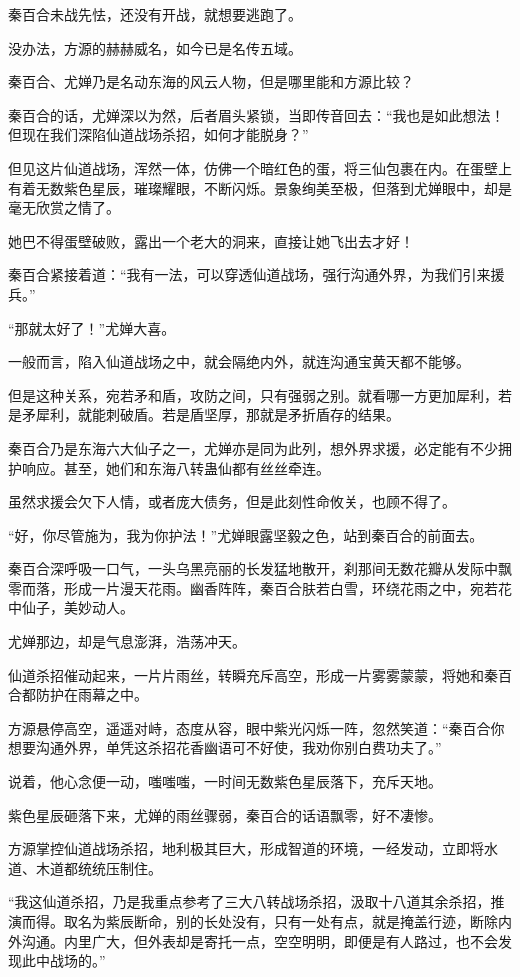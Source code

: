 \begin{this_body}
秦百合未战先怯，还没有开战，就想要逃跑了。

没办法，方源的赫赫威名，如今已是名传五域。

秦百合、尤婵乃是名动东海的风云人物，但是哪里能和方源比较？

秦百合的话，尤婵深以为然，后者眉头紧锁，当即传音回去：“我也是如此想法！但现在我们深陷仙道战场杀招，如何才能脱身？”

但见这片仙道战场，浑然一体，仿佛一个暗红色的蛋，将三仙包裹在内。在蛋壁上有着无数紫色星辰，璀璨耀眼，不断闪烁。景象绚美至极，但落到尤婵眼中，却是毫无欣赏之情了。

她巴不得蛋壁破败，露出一个老大的洞来，直接让她飞出去才好！

秦百合紧接着道：“我有一法，可以穿透仙道战场，强行沟通外界，为我们引来援兵。”

“那就太好了！”尤婵大喜。

一般而言，陷入仙道战场之中，就会隔绝内外，就连沟通宝黄天都不能够。

但是这种关系，宛若矛和盾，攻防之间，只有强弱之别。就看哪一方更加犀利，若是矛犀利，就能刺破盾。若是盾坚厚，那就是矛折盾存的结果。

秦百合乃是东海六大仙子之一，尤婵亦是同为此列，想外界求援，必定能有不少拥护响应。甚至，她们和东海八转蛊仙都有丝丝牵连。

虽然求援会欠下人情，或者庞大债务，但是此刻性命攸关，也顾不得了。

“好，你尽管施为，我为你护法！”尤婵眼露坚毅之色，站到秦百合的前面去。

秦百合深呼吸一口气，一头乌黑亮丽的长发猛地散开，刹那间无数花瓣从发际中飘零而落，形成一片漫天花雨。幽香阵阵，秦百合肤若白雪，环绕花雨之中，宛若花中仙子，美妙动人。

尤婵那边，却是气息澎湃，浩荡冲天。

仙道杀招催动起来，一片片雨丝，转瞬充斥高空，形成一片雾雾蒙蒙，将她和秦百合都防护在雨幕之中。

方源悬停高空，遥遥对峙，态度从容，眼中紫光闪烁一阵，忽然笑道：“秦百合你想要沟通外界，单凭这杀招花香幽语可不好使，我劝你别白费功夫了。”

说着，他心念便一动，嗤嗤嗤，一时间无数紫色星辰落下，充斥天地。

紫色星辰砸落下来，尤婵的雨丝骤弱，秦百合的话语飘零，好不凄惨。

方源掌控仙道战场杀招，地利极其巨大，形成智道的环境，一经发动，立即将水道、木道都统统压制住。

“我这仙道杀招，乃是我重点参考了三大八转战场杀招，汲取十八道其余杀招，推演而得。取名为紫辰断命，别的长处没有，只有一处有点，就是掩盖行迹，断除内外沟通。内里广大，但外表却是寄托一点，空空明明，即便是有人路过，也不会发现此中战场的。”


\end{this_body}
